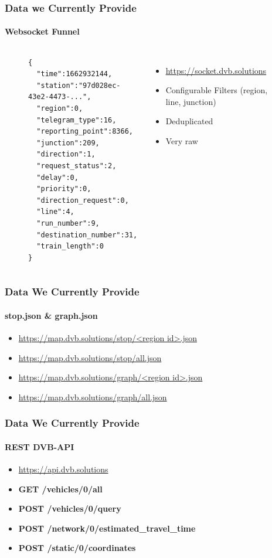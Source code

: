 \begin{frame}[fragile]
\frametitle{Data we Currently Provide}
\framesubtitle{Websocket Funnel}
\begin{figure}
\begin{columns}
\begin{lstlisting}[basicstyle=\scriptsize]
{
  "time":1662932144,
  "station":"97d028ec-43e2-4473-...",
  "region":0,
  "telegram_type":16,
  "reporting_point":8366,
  "junction":209,
  "direction":1,
  "request_status":2,
  "delay":0,
  "priority":0,
  "direction_request":0,
  "line":4,
  "run_number":9,
  "destination_number":31,
  "train_length":0
}
\end{lstlisting}
\raggedright
\vspace{0.5cm}

\begin{itemize}
  \item \url{https://socket.dvb.solutions}
  \item Configurable Filters (region, line, junction)
  \item Deduplicated
  \item Very raw
\end{itemize}
\end{columns}
\end{figure}
\end{frame}


\begin{frame}[fragile]
\frametitle{Data We Currently Provide}
\framesubtitle{stop.json \& graph.json}

  \begin{itemize}
    \item \url{https://map.dvb.solutions/stop/<region id>.json}
    \item \url{https://map.dvb.solutions/stop/all.json}
    \item \url{https://map.dvb.solutions/graph/<region id>.json}
    \item \url{https://map.dvb.solutions/graph/all.json}
  \end{itemize}
\end{frame}

\begin{frame}[fragile]
\frametitle{Data We Currently Provide}
\framesubtitle{REST DVB-API}

\begin{itemize}
     \item \url{https://api.dvb.solutions}
     \item \textbf{GET  /vehicles/0/all}
     \item \textbf{POST /vehicles/0/query}
     \item \textbf{POST /network/0/estimated\_travel\_time}
     \item \textbf{POST /static/0/coordinates}
  \end{itemize}
\end{frame}

